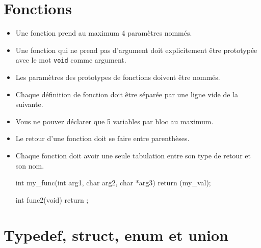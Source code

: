 \documentclass{42-fr}
\begin{document}
    \section{Fonctions}

        \begin{itemize}

            \item Une fonction prend au maximum 4 paramètres nommés.

            \item Une fonction qui ne prend pas d’argument doit explicitement être prototypée 
                avec le mot \texttt{void} comme argument.

            \item Les paramètres des prototypes de fonctions doivent être nommés.

            \item Chaque définition de fonction doit être séparée par une ligne vide de la suivante.

            \item Vous ne pouvez déclarer que 5 variables par bloc au maximum.

            \item Le retour d’une fonction doit se faire entre parenthèses.

            \item Chaque fonction doit avoir une seule tabulation entre son type
                de retour et son nom.

            \begin{42ccode}
int my_func(int arg1, char arg2, char *arg3)
{
    return (my_val);
}

int func2(void)
{
    return ;
}
            \end{42ccode}

        \end{itemize}
        \newpage


    \section{Typedef, struct, enum et union}
\end{document}

